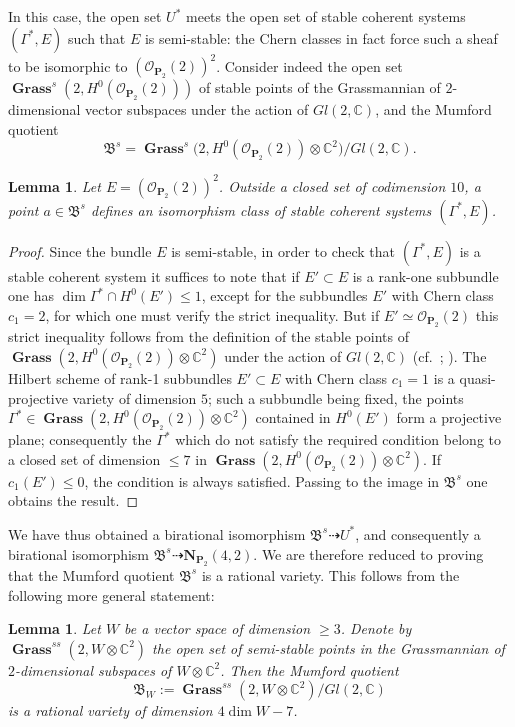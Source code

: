 \documentclass[12pt,english]{smfart}%
\theoremstyle{plain}
\newtheorem{lemma}[theorem]{Lemma}
\theoremstyle{definition}
\theoremstyle{remark}
\newcommand{\PP}{\mathbf{P}}
\newcommand{\NN}{\mathbf{N}}           %
\newcommand{\CC}{\mathbb{C}}
\newcommand{\Oo}{\mathcal{O}}
\DeclareMathOperator{\Grass}{\mathbf{Grass}}
\newcommand{\origpage}[1]{\marginnote{\scriptsize\itshape p.~#1}}
\begin{document}
In this case, the open set $U^{*}$ meets the open set of stable coherent systems $(\Gamma^{*},E)$ such that $E$ is semi-stable: the Chern classes in fact force such a sheaf to be isomorphic to $(\Oo_{\PP_2}(2))^2$. Consider indeed the open set $\Grass^s(2,H^0(\Oo_{\PP_2}(2)))$ of stable points of the Grassmannian of $2$-dimensional vector subspaces under the action of $Gl(2,\CC)$, and the Mumford quotient
\[
\mathfrak{B}^s = \Grass^s\bigl(2,H^0(\Oo_{\PP_2}(2))\otimes\CC^2\bigr)/
Gl(2,\CC).
\]

\begin{lemma}\label{lem:B-s}
Let $E=(\Oo_{\PP_2}(2))^2$. Outside a closed set of codimension $10$, a point $a\in\mathfrak{B}^s$ defines an isomorphism class of stable coherent systems $(\Gamma^{*},E)$.
\end{lemma}

\begin{proof}
Since the bundle $E$ is semi-stable, in order to check that $(\Gamma^{*},E)$ is a stable coherent system it suffices to note that if $E'\subset E$ is a rank-one subbundle one has $\dim \Gamma^{*}\cap H^0(E')\le 1$, except for the subbundles $E'$ with Chern class $c_1=2$, for which one must verify the strict inequality. But if $E'\simeq \Oo_{\PP_2}(2)$ this strict inequality follows from the definition of the stable points of $\Grass(2,H^0(\Oo_{\PP_2}(2))\otimes\CC^2)$ under the action of $Gl(2,\CC)$ (cf.\ \cite{Mum}; \cite{LeP4}). The Hilbert scheme of rank-1 subbundles $E'\subset E$ with Chern class $c_1=1$ is a quasi-projective variety of dimension $5$; such a
\origpage{675}%
subbundle being fixed, the points $\Gamma^{*}\in\Grass(2,H^0(\Oo_{\PP_2}(2))\otimes\CC^2)$ contained in $H^0(E')$ form a projective plane; consequently the $\Gamma^{*}$ which do not satisfy the required condition belong to a closed set of dimension $\le 7$ in $\Grass(2,H^0(\Oo_{\PP_2}(2))\otimes\CC^2)$. If $c_1(E')\le 0$, the condition is always satisfied. Passing to the image in $\mathfrak{B}^s$ one obtains the result.
\end{proof}

We have thus obtained a birational isomorphism $\mathfrak{B}^s\dashrightarrow U^{*}$, and consequently a birational isomorphism $\mathfrak{B}^s\dashrightarrow \NN_{\PP_2}(4,2)$. We are therefore reduced to proving that the Mumford quotient $\mathfrak{B}^s$ is a rational variety. This follows from the following more general statement:

\begin{lemma}\label{lem:BW-rational}
Let $W$ be a vector space of dimension $\ge 3$. Denote by $\Grass^{ss}(2,W\otimes\CC^2)$ the open set of semi-stable points in the Grassmannian of $2$-dimensional subspaces of $W\otimes\CC^2$. Then the Mumford quotient
\[
\mathfrak{B}_W := \Grass^{ss}(2,W\otimes\CC^2)/Gl(2,\CC)
\]
is a rational variety of dimension $4\dim W-7$.
\end{lemma}
\end{document}
